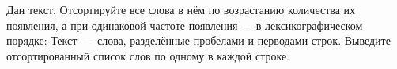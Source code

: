 Дан текст. Отсортируйте все слова в нём по возрастанию количества их появления, а при одинаковой частоте появления --- в лексикографическом порядке: 
\InputFile
Текст~--- слова, разделённые пробелами и перводами строк.
\OutputFile
Выведите отсортированный список слов по одному в каждой строке.
